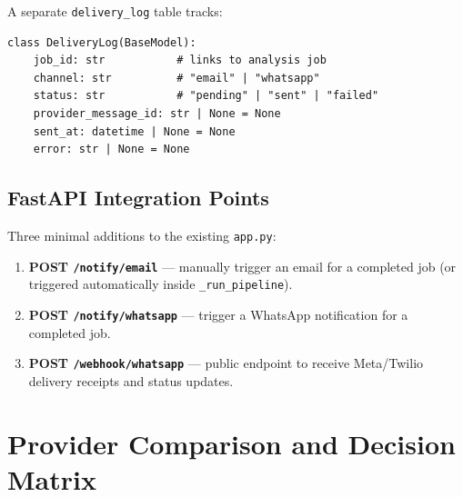 \documentclass[12pt,a4paper]{article}
\newcommand{\codeinline}[1]{\texttt{\small\color{accent}#1}}
\begin{document}
A separate \codeinline{delivery\_log} table tracks:

\begin{lstlisting}[style=python, caption={Delivery log schema (example)}]
class DeliveryLog(BaseModel):
    job_id: str           # links to analysis job
    channel: str          # "email" | "whatsapp"
    status: str           # "pending" | "sent" | "failed"
    provider_message_id: str | None = None
    sent_at: datetime | None = None
    error: str | None = None
\end{lstlisting}

\subsection{FastAPI Integration Points}

Three minimal additions to the existing \codeinline{app.py}:

\begin{enumerate}[leftmargin=2em, itemsep=2pt]
    \item \textbf{POST \codeinline{/notify/email}} --- manually trigger an
          email for a completed job (or triggered automatically inside
          \codeinline{\_run\_pipeline}).
    \item \textbf{POST \codeinline{/notify/whatsapp}} --- trigger a WhatsApp
          notification for a completed job.
    \item \textbf{POST \codeinline{/webhook/whatsapp}} --- public endpoint to
          receive Meta/Twilio delivery receipts and status updates.
\end{enumerate}

\section{Provider Comparison and Decision Matrix}
\end{document}
